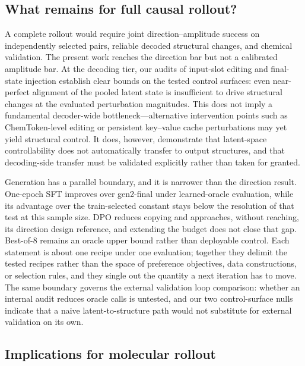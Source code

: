 \documentclass[11pt]{article}
\begin{document}
\subsection{What remains for full causal rollout?}

A complete rollout would require joint direction--amplitude success on independently selected pairs, reliable decoded structural changes, and chemical validation. The present work reaches the direction bar but not a calibrated amplitude bar. At the decoding tier, our audits of input-slot editing and final-state injection establish clear bounds on the tested control surfaces: even near-perfect alignment of the pooled latent state is insufficient to drive structural changes at the evaluated perturbation magnitudes. This does not imply a fundamental decoder-wide bottleneck---alternative intervention points such as ChemToken-level editing or persistent key--value cache perturbations may yet yield structural control. It does, however, demonstrate that latent-space controllability does not automatically transfer to output structures, and that decoding-side transfer must be validated explicitly rather than taken for granted.

Generation has a parallel boundary, and it is narrower than the direction result. One-epoch SFT improves over gen2-final under learned-oracle evaluation, while its advantage over the train-selected constant stays below the resolution of that test at this sample size. DPO reduces copying and approaches, without reaching, its direction design reference, and extending the budget does not close that gap. Best-of-8 remains an oracle upper bound rather than deployable control. Each statement is about one recipe under one evaluation; together they delimit the tested recipes rather than the space of preference objectives, data constructions, or selection rules, and they single out the quantity a next iteration has to move. The same boundary governs the external validation loop comparison: whether an internal audit reduces oracle calls is untested, and our two control-surface nulls indicate that a naive latent-to-structure path would not substitute for external validation on its own.

\subsection{Implications for molecular rollout}
\end{document}
